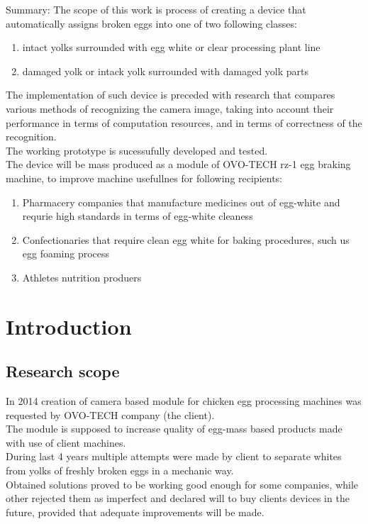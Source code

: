 \documentclass[12pt,twoside,a4paper]{article}
\begin{document}
Summary:
The scope of this work is process of creating a device that automatically assigns broken eggs into one of two following classes:
\begin{enumerate}
\item intact yolks surrounded with egg white or clear processing plant line
\item damaged yolk or intack yolk surrounded with damaged yolk parts
\end{enumerate}
The implementation of such device is preceded with research that compares various methods of recognizing the camera image, taking into account their performance in terms of computation resources, and in terms of correctness of the recognition.\\
The working prototype is sucessufully developed and tested.\\
The device will be mass produced as a module of OVO-TECH rz-1 egg braking machine, to improve machine usefullnes for following recipients:
\begin{enumerate}
\item Pharmacery companies that manufacture medicines out of egg-white and requrie high standards in terms of egg-white cleaness
\item Confectionaries that require clean egg white for baking procedures, such us egg foaming process
\item Athletes nutrition produers
\end{enumerate}



\tableofcontents



\section{Introduction}
\subsection{Research scope}
In 2014 creation of  camera based  module for chicken egg processing machines was requested by OVO-TECH company (the client).\\
The module is supposed to increase quality of egg-mass based  products made with use of  client machines.\\

During last 4 years multiple attempts were made by client to separate whites from yolks of freshly broken eggs in a mechanic way.\\ 
Obtained solutions proved to be working good enough for some companies, while other rejected them as imperfect and declared will to buy clients devices in the future, provided that adequate improvements will be made.
\end{document}
